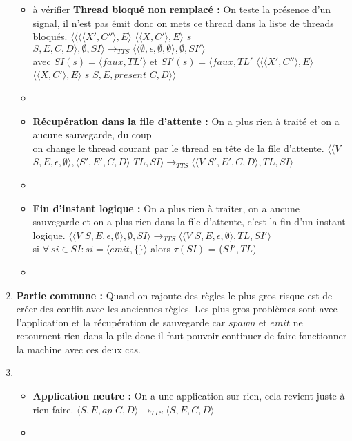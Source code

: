\documentclass[10pt,a4paper]{article}
\begin{document}
\begin{enumerate}
\begin{itemize}
						\item[] à vérifier \textbf{Thread bloqué non remplacé :} On teste la présence d'un signal, il n'est pas émit donc on mets ce thread dans la liste de threads bloqués.
						\smallbreak 
						$\langle\langle \langle\langle X',C''\rangle,E\rangle$ $\langle\langle X,C'\rangle,E\rangle$ $s$ $S,E,C,D\rangle,\emptyset,SI\rangle 
						\longrightarrow_{TTS} 
						\langle\langle \emptyset,\epsilon,\emptyset,\emptyset\rangle,\emptyset,SI'\rangle$
						\\avec $SI(s) = \langle faux,TL'\rangle$
						et $SI'(s) = \langle faux,TL'$ $\langle\langle\langle X',C''\rangle,E\rangle$ $\langle\langle X,C'\rangle,E\rangle$ $s$ $S,E,present$ $C,D\rangle\rangle$
						\item[]
							
						\item[] \textbf{Récupération dans la file d'attente :} On a plus rien à traité et on a aucune sauvegarde, du coup 
						\\on change le thread courant par le thread en tête de la file d'attente.
						\smallbreak
						$\langle\langle V$ $S,E,\epsilon,\emptyset\rangle,\langle S',E',C,D\rangle$ $TL,SI\rangle 
						\longrightarrow_{TTS} 
						\langle\langle V$ $S',E',C,D\rangle,TL,SI\rangle$
						\item[]
							
						\item[] \textbf{Fin d'instant logique :} On a plus rien à traiter, on a aucune sauvegarde et on a plus rien dans la file d'attente, c'est la fin d'un instant logique.
						\smallbreak
						$\langle\langle V$ $S,E,\epsilon,\emptyset \rangle ,\emptyset,SI\rangle 
						\longrightarrow_{TTS} 
						\langle\langle V$ $S,E,\epsilon,\emptyset\rangle,TL,SI'\rangle$
						\\si $\forall~si \in SI : si = \langle emit,\{\}\rangle$ alors $\tau(SI)$ = ($SI',TL$) 
						\item[]
							
					\end{itemize}
					\item[] \textbf{Partie commune :} Quand on rajoute des règles le plus gros risque est de créer des conflit avec les anciennes règles. Les plus gros problèmes sont avec l'application et la récupération de sauvegarde car $spawn$ et $emit$ ne retournent rien dans la pile donc il faut pouvoir continuer de faire fonctionner la machine avec ces deux cas. 
					\item[]
					\begin{itemize}
						\item[] \textbf{Application neutre :} On a une application sur rien, cela revient juste à rien faire.
						\smallbreak 
						$\langle S,E,ap$ $C,D\rangle
						\longrightarrow_{TTS} 
						\langle S,E,C,D\rangle$
						\item[]
						

\end{itemize}
\end{enumerate}
\end{document}
